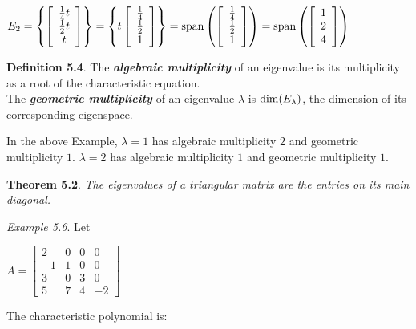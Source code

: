 \documentclass[
  letterpaper,
  DIV=11,
  numbers=noendperiod]{scrartcl}
\theoremstyle{remark}
\begin{document}
\(E_{2} = \left\{\left[\begin{array}{c} \frac{1}{4}t \\ \frac{1}{2}t \\ t \end{array}\right]\right\} = \left\{t \left[\begin{array}{c} \frac{1}{4} \\ \frac{1}{2} \\ 1 \end{array}\right]\right\} = {\rm span}\left(\left[\begin{array}{c} \frac{1}{4} \\ \frac{1}{2} \\ 1 \end{array}\right]\right) = {\rm span}\left(\left[\begin{array}{c} 1 \\ 2 \\ 4 \end{array}\right]\right)\)

\textbf{Definition 5.4}. The \textbf{\emph{algebraic multiplicity}} of
an eigenvalue is its multiplicity as a root of the characteristic
equation.\\
The \textbf{\emph{geometric multiplicity}} of an eigenvalue \(\lambda\)
is \({\rm dim} (E_{\lambda })\), the dimension of its corresponding
eigenspace.

In the above Example, \(\lambda = 1\) has algebraic multiplicity \(2\)
and geometric multiplicity \(1\). \(\lambda = 2\) has algebraic
multiplicity \(1\) and geometric multiplicity \(1\).

\textbf{Theorem 5.2}. \emph{The eigenvalues of a triangular matrix are
the entries on its main diagonal.}

\emph{Example 5.6}. Let

\(A = \left[\begin{array}{cccc} 2 & 0 & 0 & 0 \\ -1 & 1 & 0 & 0 \\ 3 & 0 & 3 & 0 \\ 5 & 7 & 4 & -2 \end{array}\right]\)

The characteristic polynomial is:
\end{document}
